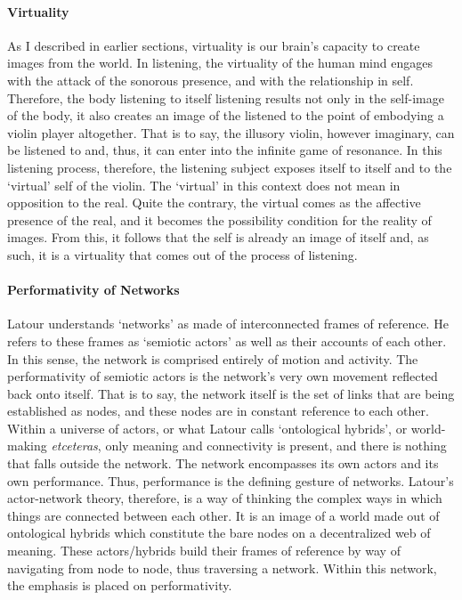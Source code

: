 \paragraph{Virtuality}
As I described in earlier sections, virtuality is our brain's capacity to create images from the world. In listening, the virtuality of the human mind engages with the attack of the sonorous presence, and with the relationship in self. Therefore, the body listening to itself listening results not only in the self-image of the body, it also creates an image of the listened to the point of embodying a violin player altogether. That is to say, the illusory violin, however imaginary, can be listened to and, thus, it can enter into the infinite game of resonance. In this listening process, therefore, the listening subject exposes itself to itself and to the `virtual' self of the violin. The `virtual' in this context does not mean in opposition to the real. Quite the contrary, the virtual comes as the affective presence of the real, and it becomes the possibility condition for the reality of images. From this, it follows that the self is already an image of itself and, as such, it is a virtuality that comes out of the process of listening.

\paragraph{Performativity of Networks}
Latour understands `networks' as made of interconnected frames of reference. He refers to these frames as `semiotic actors' as well as their accounts of each other. In this sense, the network is comprised entirely of motion and activity. The performativity of semiotic actors is the network's very own movement reflected back onto itself. That is to say, the network itself is the set of links that are being established as nodes, and these nodes are in constant reference to each other. Within a universe of actors, or what Latour calls `ontological hybrids', or world-making \textit{etceteras}, only meaning and connectivity is present, and there is nothing that falls outside the network. The network encompasses its own actors and its own performance. Thus, performance is the defining gesture of networks. Latour's actor-network theory, therefore, is a way of thinking the complex ways in which things are connected between each other. It is an image of a world made out of ontological hybrids which constitute the bare nodes on a decentralized web of meaning. These actors/hybrids build their frames of reference by way of navigating from node to node, thus traversing a network. Within this network, the emphasis is placed on performativity.


